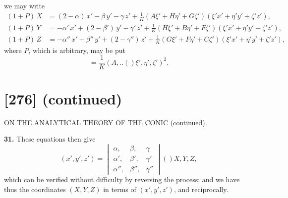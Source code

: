 \documentclass[11pt,a4paper]{book}
\providecommand{\qform}[1]{(#1)}
\begin{document}
we may write
\begin{align*}
(1+P)\,X &= (2-\alpha)\,x' - \beta\,y' - \gamma\,z' + \tfrac{1}{K}(A\xi' + H\eta' + G\zeta')(\xi'x' + \eta'y' + \zeta'z'),\\
(1+P)\,Y &= -\alpha'\,x' + (2-\beta')\,y' - \gamma'\,z' + \tfrac{1}{K}(H\xi' + B\eta' + F\zeta')(\xi'x' + \eta'y' + \zeta'z'),\\
(1+P)\,Z &= -\alpha''\,x' - \beta''\,y' + (2-\gamma'')\,z' + \tfrac{1}{K}(G\xi' + F\eta' + C\zeta')(\xi'x' + \eta'y' + \zeta'z'),
\end{align*}
where $P$, which is arbitrary, may be put
\[
= \frac{1}{K}(A,..\!\qform{}{\xi', \eta', \zeta'})^{2}.
\]

\newpage
\section*{[276] (continued)}
\begin{center}
{\large ON THE ANALYTICAL THEORY OF THE CONIC (continued).}
\end{center}

\textbf{31.} These equations then give
\[
(x', y', z') =
\begin{vmatrix}
\alpha, & \beta, & \gamma \\
\alpha', & \beta', & \gamma' \\
\alpha'', & \beta'', & \gamma''
\end{vmatrix}
\!\qform{}{X, Y, Z},
\]
which can be verified without difficulty by reversing the process; and we have thus the coordinates $(X, Y, Z)$ in terms of $(x', y', z')$, and reciprocally.
\end{document}
